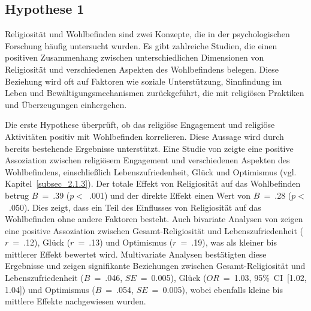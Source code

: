 \subsection{Hypothese 1}  \label{subsec_2.2.1}
Religiosität und Wohlbefinden sind zwei Konzepte, die in der psychologischen Forschung häufig untersucht wurden. Es gibt zahlreiche Studien, die einen positiven Zusammenhang zwischen unterschiedlichen Dimensionen von Religiosität und verschiedenen Aspekten des Wohlbefindens belegen. Diese Beziehung wird oft auf Faktoren wie soziale Unterstützung, Sinnfindung im Leben und Bewältigungsmechanismen zurückgeführt, die mit religiösen Praktiken und Überzeugungen einhergehen.

Die erste Hypothese überprüft, ob das religiöse Engagement und religiöse Aktivitäten positiv mit Wohlbefinden korrelieren. Diese Aussage wird durch bereits bestehende Ergebnisse unterstützt. Eine Studie von \textcite{DarIqbal2019} zeigte eine positive Assoziation zwischen religiösem Engagement und verschiedenen Aspekten des Wohlbefindens, einschließlich Lebenszufriedenheit, Glück und Optimismus (vgl. Kapitel~\ref{subsec_2.1.3}). Der totale Effekt von Religiosität auf das Wohlbefinden betrug $B$~=~.39 ($p<$~.001) und der direkte Effekt einen Wert von $B$~=~.28 ($p<$~.050). Dies zeigt, dass ein Teil des Einflusses von Religiosität auf das Wohlbefinden ohne andere Faktoren besteht. Auch bivariate Analysen von \textcite{KoenigShohaib2023} zeigen eine positive Assoziation zwischen Gesamt-Religiosität und Lebenszufriedenheit ($r$~=~.12), Glück ($r$~=~.13) und Optimismus ($r$~=~.19), was als kleiner bis mittlerer Effekt bewertet wird. Multivariate Analysen bestätigten diese Ergebnisse und zeigen signifikante Beziehungen zwischen Gesamt-Religiosität und Lebenszufriedenheit ($B$~=~.046, $SE$~=~0.005), Glück ($OR$~=~1.03, 95\%~CI~[1.02, 1.04]) und Optimismus ($B$~=~.054, $SE$~=~0.005), wobei ebenfalls kleine bis mittlere Effekte nachgewiesen wurden. 

